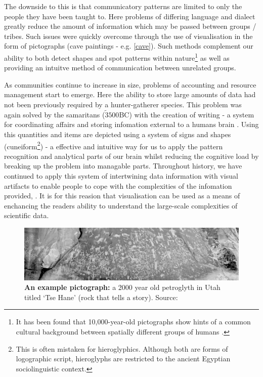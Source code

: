 The downside to this is that communicatory patterns are limited to only the people they have been taught to. Here problems of differing language and dialect greatly reduce the amount of information which may be passed between groups / tribes. Such issues were quickly overcome through the use of visualisation in the form of pictographs (cave paintings - e.g. \autoref{cave}). Such methods complement our ability to both detect shapes and spot patterns within nature\footnote{It has been found that 10,000-year-old pictographs show hints of a common cultural background between spatially different groups of humans \citep{cave}.} as well as providing an intuitve method of communication between unrelated groups.


As communities continue to increase in size, problems of accounting and resource management start to emerge. Here the ability to store large amounts of data had not been previously required by a hunter-gatherer species. This problem was again solved by the samaritans ($\tilde 3500$BC) with the creation of writing - a system for coordinating affairs and storing infomation external to a humans brain \citep{archaic,beforeCuneiform}. Using this quantities and items are depicted using a system of signs and shapes (cuneiform\footnote{This is often mistaken for hieroglyphics. Although both are forms of logographic script, hieroglyphs are restricted to the ancient Egyptian sociolinguistic context. }) - a effective and intuitive way for us to apply the pattern recognition and analytical parts of our brain whilst reducing the cognitive load by breaking up the problem into managable parts.
Throughout history, we have continued to apply this system of intertwining data information with visual artifacts to enable people to cope with the complexities of the infomation provided, \citep{tufte}. It is for this reasion that visualisation can be used as a means of enchancing the readers ability to understand the large-scale complexities of scientific data.


\begin{figure}[H]
         \centering
         \includegraphics[width=\textwidth]{figures_c1/newspaperrock.jpg}
        \caption{\textbf{An example pictograph:} a 2000 year old petroglyth in Utah titled `Tse Hane' (rock that tells a story). Source:
        \citep{newspaperrock} }
        \label{cave}
\end{figure}


